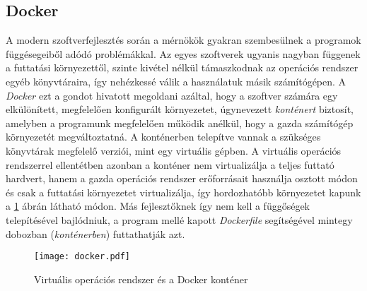\subsection{Docker} \label{subs:docker_bevezeto}

A modern szoftverfejlesztés során a mérnökök gyakran szembesülnek a programok függésegeiből adódó problémákkal. Az egyes szoftverek ugyanis nagyban függenek a futtatási környezettől, szinte kivétel nélkül támaszkodnak az operációs rendszer egyéb könyvtáraira, így nehézkessé válik a használatuk másik számítógépen. A \emph{Docker} ezt a gondot hivatott megoldani azáltal, hogy a szoftver számára egy elkülönített, megfelelően konfigurált környezetet, úgynevezett \emph{konténert} biztosít, amelyben a programunk megfelelően működik anélkül, hogy a gazda számítógép környezetét megváltoztatná. A konténerben telepítve vannak a szükséges könyvtárak megfelelő verziói, mint egy virtuális gépben. A virtuális operációs rendszerrel ellentétben azonban a konténer nem virtualizálja a teljes futtató hardvert, hanem a gazda operációs rendszer erőforrásait használja osztott módon és csak a futtatási környezetet virtualizálja, így hordozhatóbb környezetet kapunk a \ref{fig:docker} ábrán látható módon. \cite{docker-doc} Más fejlesztőknek így nem kell a függőségek telepítésével bajlódniuk, a program mellé kapott \emph{Dockerfile} segítségével mintegy dobozban (\emph{konténerben}) futtathatják azt.

\begin{figure}[h]
\vspace{.5cm}
\texttt{[image: docker.pdf]}
\centering
\vspace{.2cm}
\caption{Virtuális operációs rendszer és a Docker konténer}
\vspace{.5cm}
\label{fig:docker}
\end{figure}

